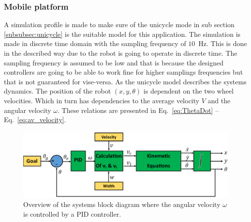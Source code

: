 \subsubsection{Mobile platform}
A simulation profile is made to make sure of the unicycle mode in sub section \ref{subsubsec:unicycle} is the suitable model for this application.
The simulation is made in discrete time domain with the sampling frequency of $10$~Hz.
This is done in the described way due to the robot is going to operate in discrete time.
The sampling frequency is assumed to be low and that is because the designed controllers are going to be able to work fine for higher samplings frequencies but that is not guaranteed for vise-versa.
As the unicycle model describes the systems dynamics.
The position of the robot $(x, y, \theta)$ is dependent on the two wheel velocities. Which in turn has dependencies to the average velocity $V$ and the angular velocity $\omega$. These relations are presented in Eq.~\eqref{eq:ThetaDot} -- Eq.~\eqref{eq:av_velocity}.
\begin{figure}[h]
\centering
\includegraphics[width=\textwidth]{sections/assets/omegaCtrlr.png}
\caption{Overview of the systems block diagram where the angular velocity $\omega$ is controlled by a PID controller.}
\label{fig:overview}
\end{figure}

